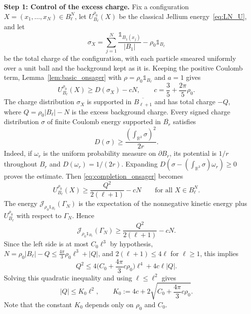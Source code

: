 \documentclass[final,reqno]{amsart}
\theoremstyle{remark}
\theoremstyle{definition}
\renewcommand{\le}{\leqslant}
\renewcommand{\ge}{\geqslant}
\newcommand{\RR}{\mathbb{R}}
\newcommand{\iden}{\mathbb{1}}
\begin{document}
\medskip

\noindent\textbf{Step 1: Control of the excess charge.}
Fix a configuration $X=(x_1,\dots,x_N)\in B_\ell^N$, let $U^{\rho_0}_{B_\ell}(X)$ be the classical Jellium energy~\eqref{eq:LN_U},
 and let
\[
\sigma_X=\sum_{j=1}^N\frac{\iden_{B_1(x_j)}}{|B_1|}-\rho_0\iden_{B_\ell}
\]
be the total charge of the configuration, with each particle smeared uniformly over a unit ball and the background kept as it is. Keeping the positive Coulomb term, Lemma~\ref{lem:basic_onsager} with $\rho=\rho_0\iden_{B_\ell}$ and $a=1$ gives
\begin{equation}\label{eq:completion_onsager}
U^{\rho_0}_{B_\ell}(X)\ge D(\sigma_X)-cN,
\qquad c=\frac35+\frac{2\pi}5\rho_0.
\end{equation}
The charge distribution $\sigma_X$ is supported in $\overline{B_{\ell+1}}$ and has total charge $-Q$, where $Q=\rho_0|B_\ell|-N$ is the excess background charge.
Every signed charge distribution $\sigma$ of finite Coulomb energy supported in $\overline{B_r}$ satisfies
\[
D(\sigma)\ge\frac{(\int_{\RR^3}\sigma)^2}{2r}.
\]
Indeed, if $\omega_r$ is the uniform probability measure on $\partial B_r$, its potential is $1/r$ throughout $B_r$ and $D(\omega_r)=1/(2r)$. Expanding $D(\sigma-(\int_{\RR^3}\sigma)\omega_r)\ge0$ proves the estimate. Then \eqref{eq:completion_onsager} becomes
\[
U^{\rho_0}_{B_\ell}(X)\ge\frac{Q^2}{2(\ell+1)}-cN
\qquad\text{for all }X\in B_\ell^N.
\]
The energy $\mathcal J_{\rho_0\iden_{B_\ell}}(\Gamma_N)$ is the expectation of the nonnegative kinetic energy plus $U^{\rho_0}_{B_\ell}$ with respect to $\Gamma_N$. Hence
\begin{equation}\label{eq:completion_charge_coercivity}
\mathcal J_{\rho_0\iden_{B_\ell}}(\Gamma_N)
\ge\frac{Q^2}{2(\ell+1)}-cN.
\end{equation}
Since the left side is at most $C_0\ell^3$ by hypothesis, $N=\rho_0|B_\ell|-Q\le\frac{4\pi}3\rho_0\ell^3+|Q|$, and $2(\ell+1)\le4\ell$ for $\ell\ge1$, this implies
\[
Q^2\le4\Big(C_0+\frac{4\pi}3c\rho_0\Big)\ell^4+4c\ell|Q|.
\]
Solving this quadratic inequality and using $\ell\le\ell^2$ gives
\begin{equation}\label{eq:completion_charge_bound}
|Q|\le K_0\ell^2,\qquad K_0:=4c+2\sqrt{C_0+\frac{4\pi}3c\rho_0}.
\end{equation}
Note that the constant $K_0$ depends only on $\rho_0$ and $C_0$.
\end{document}
